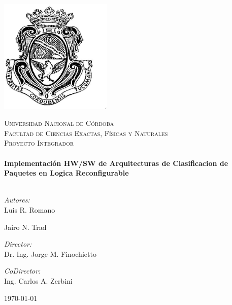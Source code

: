 
\begin{titlepage}
\begin{center}
\includegraphics[width=0.4\textwidth]{Logo-UNC.eps}

\textsc{\LARGE Universidad Nacional de Córdoba}\\[0.5cm]
\textsc{\Large Facultad de Ciencias Exactas, Físicas y Naturales}\\[1cm]
\textsc{\large Proyecto Integrador}\\[0.5cm]

\HRule \\[0.4cm]
{ \huge \bfseries Implementación HW/SW de Arquitecturas de Clasificacion de Paquetes en Logica Reconfigurable}\\[0.4cm]
\HRule \\[1.5cm]

\begin{minipage}{0.4\textwidth}
\begin{flushleft} \large
\emph{Autores:}\\
Luis R. Romano

Jairo N. Trad
\end{flushleft}
\end{minipage}
\begin{minipage}{0.43\textwidth}
\begin{flushright} \large
\emph{Director:} \\
 Dr. Ing. Jorge M. Finochietto

\emph{CoDirector:} \\
 Ing. Carlos A. Zerbini

\end{flushright}
\end{minipage}

\vfill

{\large \today}

\end{center}

\end{titlepage}
